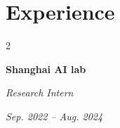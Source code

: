 \documentclass[10pt, letterpaper]{article}
\newenvironment{twocolentry}[2][]{
    \onecolentry
    \def\secondColumn{#2}
    \setcolumnwidth{\fill, 4.5 cm}
    \begin{paracol}{2}
}{
    \switchcolumn \raggedleft \secondColumn
    \end{paracol}
    \endonecolentry
} %
\begin{document}
    



        
            
            
            
            

            
            

    \section{Experience}

        \begin{twocolentry}{
        \textit{Sep. 2022 -- Aug. 2024}}
            \textbf{Shanghai AI lab} 
            
            \textit{Research Intern}
            

        \end{twocolentry}
\end{document}
